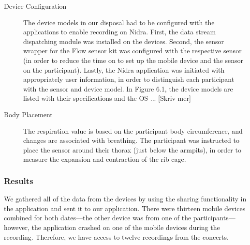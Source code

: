 \begin{description}
    \item[Device Configuration] The device models in our disposal had to be configured with the applications to enable recording on Nidra. First, the data stream dispatching module was installed on the devices. Second, the sensor wrapper for the Flow sensor kit was configured with the respective sensor (in order to reduce the time on to set up the mobile device and the sensor on the participant). Lastly, the Nidra application was initiated with appropriately user information, in order to distinguish each participant with the sensor and device model. In Figure 6.1, the device models are listed with their specifications and the OS ... [Skriv mer]
    \item[Body Placement] The respiration value is based on the participant body circumference, and changes are associated with breathing. The participant was instructed to place the sensor around their thorax (just below the armpits), in order to measure the expansion and contraction of the rib cage.

\end{description}

\subsubsection{Results}

We gathered all of the data from the devices by using the sharing functionality in the application and sent it to our application. There were thirteen mobile devices combined for both dates---the other device was from one of the participants---however, the application crashed on one of the mobile devices during the recording. Therefore, we have access to twelve recordings from the concerts. 

